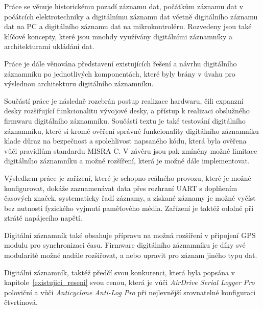 Práce se věnuje historickému pozadí záznamu dat, počátkům záznamu dat v počátcích elektrotechniky a digitálnímu záznamu dat včetně digitálního záznamu dat na PC a digitálního záznamu dat na mikrokontroléru. Rozvedeny jsou také klíčové koncepty, které jsou mnohdy využívány digitálními záznamníky a architekturami ukládání dat.

Práce je dále věnována představení existujících řešení a návrhu digitálního záznamníku po jednotlivých komponentách, které byly brány v úvahu pro výslednou architekturu digitálního záznamníku.

Součástí práce je následně rozebrán postup realizace hardwaru, čili expanzní desky rozšiřující funkcionalitu vývojové desky, a přístup k realizaci obslužného firmwaru digitálního záznamníku. Součástí textu je také testování digitálního záznamníku, které si kromě ověření správné funkcionality digitálního záznamníku klade důraz na bezpečnost a spolehlivost napsaného kódu, která byla ověřena vůči pravidlům standardu MISRA C. V závěru jsou pak zmíněny možné limitace digitálního záznamníku a možné rozšíření, která je možné dále implementovat.

Výsledkem práce je zařízení, které je schopno reálného provozu, které je možné konfigurovat, dokáže zaznamenávat data přes rozhraní UART s doplňením časových značek, systematicky řadí záznamy, a získané záznamy je možné vyčíst bez nutnosti fyzického vyjmutí paměťového média. Zařízení je taktéž odolné při ztrátě napájecího napětí. 

Digitální záznamník také obsahuje přípravu na možná rozšíření v připojení GPS modulu pro synchronizaci času. Firmware digitálního záznamníku je díky své modularitě možné nadále rozšiřovat, a nebo upravit pro záznam jiného typu dat.

Digitální záznamník, taktéž předčí svou konkurenci, která byla popsána v kapitole~\ref{existujici_reseni} svou cenou, která je vůči \textit{AirDrive Serial Logger Pro} poloviční a vůči \textit{Anticyclone Anti-Log Pro} při nejlevnější srovnatelné konfiguraci čtvrtinová.


%
